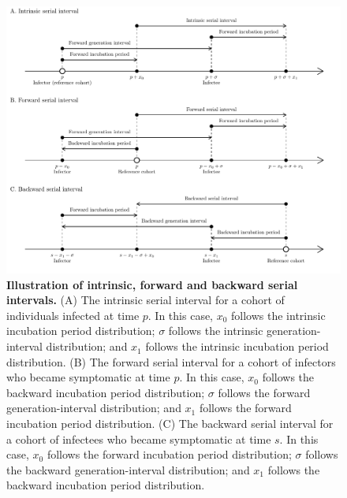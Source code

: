 \documentclass[12pt]{article}
\newcommand{\psymp}{\ensuremath{p}} %
\newcommand{\ssymp}{\ensuremath{s}} %
\newcommand{\gtime}{\sigma} %
\providecommand{\DIFaddtex}[1]{{\protect\color{blue}\uwave{#1}}} %
\providecommand{\DIFdeltex}[1]{{\protect\color{red}\sout{#1}}}                      %
\providecommand{\DIFaddFL}[1]{\DIFadd{#1}} %
\providecommand{\DIFdelFL}[1]{\DIFdel{#1}} %
\providecommand{\DIFaddbeginFL}{} %
\providecommand{\DIFaddendFL}{} %
\providecommand{\DIFdelbeginFL}{} %
\providecommand{\DIFdelendFL}{} %
\providecommand{\DIFadd}[1]{\texorpdfstring{\DIFaddtex{#1}}{#1}} %
\providecommand{\DIFdel}[1]{\texorpdfstring{\DIFdeltex{#1}}{}} %
\newcommand{\DIFscaledelfig}{0.5}
\newlength{\DIFdelgraphicswidth} %
\newlength{\DIFdelgraphicsheight} %
\newcommand{\DIFaddincludegraphics}[2][]{{\color{blue}\fbox{\DIFOincludegraphics[#1]{#2}}}} %
\newcommand{\DIFdelincludegraphics}[2][]{%
\sbox{\DIFdelgraphicsbox}{\DIFOincludegraphics[#1]{#2}}%
\settoboxwidth{\DIFdelgraphicswidth}{\DIFdelgraphicsbox} %
\settoboxtotalheight{\DIFdelgraphicsheight}{\DIFdelgraphicsbox} %
\scalebox{\DIFscaledelfig}{%
\parbox[b]{\DIFdelgraphicswidth}{\usebox{\DIFdelgraphicsbox}\\[-\baselineskip] \rule{\DIFdelgraphicswidth}{0em}}\llap{\resizebox{\DIFdelgraphicswidth}{\DIFdelgraphicsheight}{%
\setlength{\unitlength}{\DIFdelgraphicswidth}%
\begin{picture}(1,1)%
\thicklines\linethickness{2pt} %
{\color[rgb]{1,0,0}\put(0,0){\framebox(1,1){}}}%
{\color[rgb]{1,0,0}\put(0,0){\line( 1,1){1}}}%
{\color[rgb]{1,0,0}\put(0,1){\line(1,-1){1}}}%
\end{picture}%
}\hspace*{3pt}}} %
} %
\DeclareRobustCommand{\DIFaddbeginFL}{\DIFOaddbeginFL \let\includegraphics\DIFaddincludegraphics} %
\DeclareRobustCommand{\DIFaddendFL}{\DIFOaddendFL \let\includegraphics\DIFOincludegraphics} %
\DeclareRobustCommand{\DIFdelbeginFL}{\DIFOdelbeginFL \let\includegraphics\DIFdelincludegraphics} %
\DeclareRobustCommand{\DIFdelendFL}{\DIFOaddendFL \let\includegraphics\DIFOincludegraphics} %
\begin{document}
\begin{figure}[!th]
\includegraphics[width=\textwidth]{serial_guide.pdf}
\caption{
\textbf{Illustration of intrinsic, forward and backward serial intervals.}
(A) The intrinsic serial interval for a cohort of individuals infected at time $\psymp$.
In this case, \DIFdelbeginFL \DIFdelFL{$x_0$ }\DIFdelendFL \DIFaddbeginFL \DIFaddFL{$x_1$ }\DIFaddendFL follows the intrinsic incubation period distribution;
$\gtime$ follows the intrinsic generation-interval distribution;
and \DIFdelbeginFL \DIFdelFL{$x_1$ }\DIFdelendFL \DIFaddbeginFL \DIFaddFL{$x_2$ }\DIFaddendFL follows the intrinsic incubation period distribution.
(B) The forward serial interval for a cohort of infectors who became symptomatic at time $\psymp$.
In this case, \DIFdelbeginFL \DIFdelFL{$x_0$ }\DIFdelendFL \DIFaddbeginFL \DIFaddFL{$x_1$ }\DIFaddendFL follows the backward incubation period distribution;
$\gtime$ follows the forward generation-interval distribution;
and \DIFdelbeginFL \DIFdelFL{$x_1$ }\DIFdelendFL \DIFaddbeginFL \DIFaddFL{$x_2$ }\DIFaddendFL follows the forward incubation period distribution.
(C) The backward serial interval for a cohort of infectees who became symptomatic at time $\ssymp$.
In this case, \DIFdelbeginFL \DIFdelFL{$x_0$ }\DIFdelendFL \DIFaddbeginFL \DIFaddFL{$x_1$ }\DIFaddendFL follows the forward incubation period distribution;
$\gtime$ follows the backward generation-interval distribution;
and \DIFdelbeginFL \DIFdelFL{$x_1$ }\DIFdelendFL \DIFaddbeginFL \DIFaddFL{$x_2$ }\DIFaddendFL follows the backward incubation period distribution.
}
\label{fig:diagram}
\end{figure}
\end{document}
